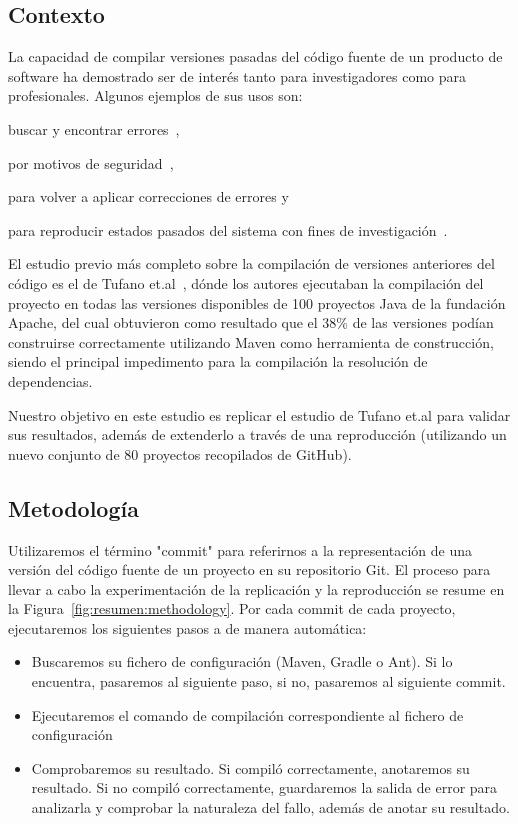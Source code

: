\subsection{Contexto}
La capacidad de compilar versiones pasadas del código fuente de un producto de software ha demostrado ser de interés tanto para investigadores como para profesionales. 
Algunos ejemplos de sus usos son: 
\begin{inparaenum}[\bf(1)]
    \item buscar y encontrar errores~\cite{Zimmermann:2006:MVA:1137983.1138001}, 
    \item por motivos de seguridad~\cite{deCarnedeCarnavalet:2014:CIV:2664243.2664288}, 
    \item para volver a aplicar correcciones de errores y~\cite{tian2017mining} 
    \item para reproducir estados pasados del sistema con fines de investigación~\cite{manacero2011using,Zimmermann2008}.
\end{inparaenum}

El estudio previo más completo sobre la compilación de versiones anteriores del código es el de Tufano et.al~\cite{tufano2017there}, dónde los autores ejecutaban la compilación del proyecto en todas las versiones disponibles de 100 proyectos Java de la fundación Apache, del cual obtuvieron como resultado que el 38\% de las versiones podían construirse correctamente utilizando Maven como herramienta de construcción, siendo el principal impedimento para la compilación la resolución de dependencias.

Nuestro objetivo en este estudio es replicar el estudio de Tufano et.al para validar sus resultados, además de extenderlo a través de una reproducción (utilizando un nuevo conjunto de 80 proyectos recopilados de GitHub).

\subsection{Metodología}

Utilizaremos el término "commit" para referirnos a la representación de una versión del código fuente de un proyecto en su repositorio Git.
El proceso para llevar a cabo la experimentación de la replicación y la reproducción se resume en la Figura~\ref{fig:resumen:methodology}.
Por cada commit de cada proyecto, ejecutaremos los siguientes pasos a de manera automática:
\begin{itemize}
    \item Buscaremos su fichero de configuración (Maven, Gradle o Ant). Si lo encuentra, pasaremos al siguiente paso, si no, pasaremos al siguiente commit.
    \item Ejecutaremos el comando de compilación correspondiente al fichero de configuración
    \item Comprobaremos su resultado. Si compiló correctamente, anotaremos su resultado. Si no compiló correctamente, guardaremos la salida de error para analizarla y comprobar la naturaleza del fallo, además de anotar su resultado.
\end{itemize}

